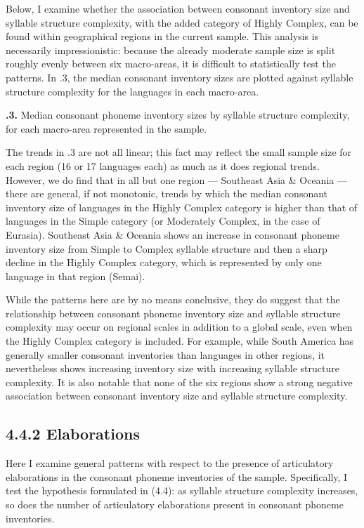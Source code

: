   Below, I examine whether the association between consonant inventory size and syllable structure complexity, with the added category of Highly Complex, can be found within geographical regions in the current sample. This analysis is necessarily impressionistic: because the already moderate sample size is split roughly evenly between six macro-areas, it is difficult to statistically test the patterns. In .3, the median consonant inventory sizes are plotted against syllable structure complexity for the languages in each macro-area.

\textbf{.3.} Median consonant phoneme inventory sizes by syllable structure complexity, for each macro-area represented in the sample.

  The trends in .3 are not all linear; this fact may reflect the small sample size for each region (16 or 17 languages each) as much as it does regional trends. However, we do find that in all but one region — Southeast Asia \& Oceania — there are general, if not monotonic, trends by which the median consonant inventory size of languages in the Highly Complex category is higher than that of languages in the Simple category (or Moderately Complex, in the case of Eurasia). Southeast Asia \& Oceania shows an increase in consonant phoneme inventory size from Simple to Complex syllable structure and then a sharp decline in the Highly Complex category, which is represented by only one language in that region (Semai).

  While the patterns here are by no means conclusive, they do suggest that the relationship between consonant phoneme inventory size and syllable structure complexity may occur on regional scales in addition to a global scale, even when the Highly Complex category is included. For example, while South America has generally smaller consonant inventories than languages in other regions, it nevertheless shows increasing inventory size with increasing syllable structure complexity. It is also notable that none of the six regions show a strong negative association between consonant inventory size and syllable structure complexity.

\subsection{4.4.2 Elaborations}

  Here I examine general patterns with respect to the presence of articulatory elaborations in the consonant phoneme inventories of the sample. Specifically, I test the hypothesis formulated in (4.4): as syllable structure complexity increases, so does the number of articulatory elaborations present in consonant phoneme inventories.

